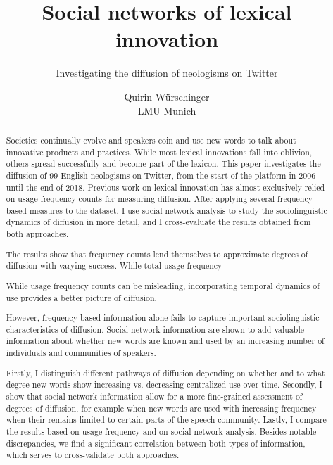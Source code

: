 \documentclass[
  a4paper,
  abstract=on,
  captions=tableabove
  ]{scrartcl}
\begin{document}

  \title{Social networks of lexical innovation}
  \subtitle{Investigating the diffusion of neologisms on Twitter}
  \author{Quirin Würschinger\\ LMU Munich}
  \maketitle

  \cleardoublepage


  \listoffigures
  \listoftables

\cleardoublepage


  \begin{abstract}


    Societies continually evolve and speakers coin and use new words to talk about innovative products and practices. While most lexical innovations fall into oblivion, others spread successfully and become part of the lexicon. This paper investigates the diffusion of 99 English neologisms on Twitter, from the start of the platform in 2006 until the end of 2018. Previous work on lexical innovation has almost exclusively relied on usage frequency counts for measuring diffusion. After applying several frequency-based measures to the dataset, I use social network analysis to study the sociolinguistic dynamics of diffusion in more detail, and I cross-evaluate the results obtained from both approaches.

    The results show that frequency counts lend themselves to approximate degrees of diffusion with varying success. While total usage frequency

    While usage frequency counts can be misleading, incorporating temporal dynamics of use provides a better picture of diffusion.

    However, frequency-based information alone fails to capture important sociolinguistic characteristics of diffusion. Social network information are shown to add valuable information about whether new words are known and used by an increasing number of individuals and communities of speakers.

    Firstly, I distinguish different pathways of diffusion depending on whether and to what degree new words show increasing vs. decreasing centralized use over time.
    Secondly, I show that social network information allow for a more fine-grained assessment of degrees of diffusion, for example when new words are used with increasing frequency when their remains limited to certain parts of the speech community.
    Lastly, I compare the results based on usage frequency and on social network analysis. Besides notable discrepancies, we find a significant correlation between both types of information, which serves to cross-validate both approaches.


\end{abstract}
\end{document}
